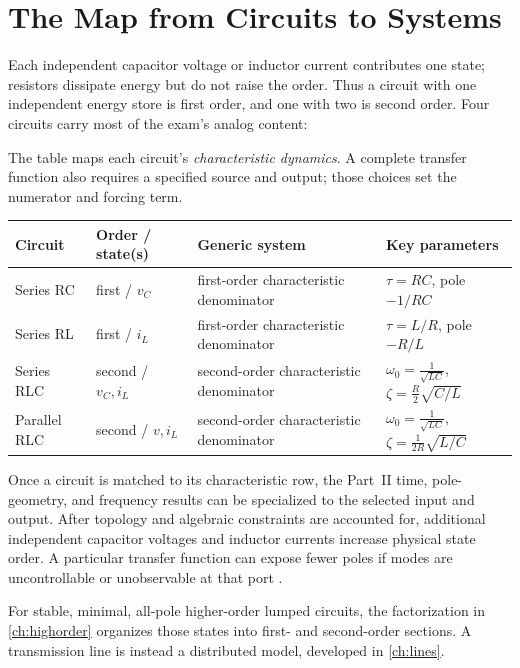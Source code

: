 \section{The Map from Circuits to Systems}
Each independent capacitor voltage or inductor current contributes one state;
resistors dissipate energy but do not raise the order. Thus a circuit with one
independent energy store is first order, and one with two is second order. Four
circuits carry most of the exam's analog content:

The table maps each circuit's \emph{characteristic dynamics}. A complete transfer
function also requires a specified source and output; those choices set the
numerator and forcing term.

\begin{center}
\begin{tabularx}{\textwidth}{@{}L{0.15\textwidth}L{0.19\textwidth}L{0.24\textwidth}Y@{}}
\toprule
Circuit & Order / state(s) & Generic system & Key parameters \\
\midrule
Series RC & first / \(v_C\) & first-order characteristic denominator & \(\tau=RC\), pole \(-1/RC\) \\
Series RL & first / \(i_L\) & first-order characteristic denominator & \(\tau=L/R\), pole \(-R/L\) \\
Series RLC & second / \(v_C,i_L\) & second-order characteristic denominator & \(\omega_0=\tfrac{1}{\sqrt{LC}}\), \(\zeta=\tfrac{R}{2}\sqrt{C/L}\) \\
Parallel RLC & second / \(v,i_L\) & second-order characteristic denominator & \(\omega_0=\tfrac{1}{\sqrt{LC}}\), \(\zeta=\tfrac{1}{2R}\sqrt{L/C}\) \\
\bottomrule
\end{tabularx}
\end{center}

Once a circuit is matched to its characteristic row, the Part~II time,
pole-geometry, and frequency results can be specialized to the selected input and
output. After topology and algebraic constraints are accounted for, additional
independent capacitor voltages and inductor currents increase physical state order.
A particular transfer function can expose fewer poles if modes are uncontrollable
or unobservable at that port
\cite[pp.~199--203, 264--266]{leigh2012control}.

For stable, minimal, all-pole higher-order lumped circuits, the factorization in
\cref{ch:highorder} organizes those states into first- and second-order sections.
A transmission line is instead a distributed model, developed in \cref{ch:lines}.
